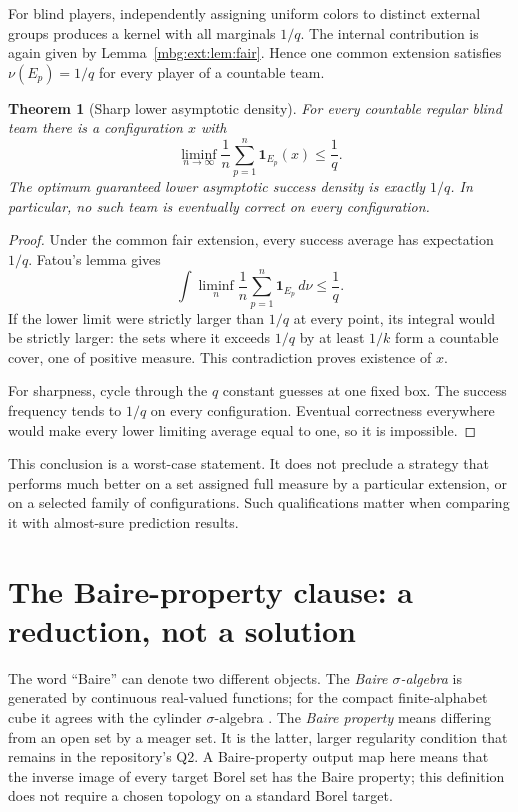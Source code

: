 \documentclass[11pt,letterpaper]{article}
\newtheorem{theorem}{Theorem}[section]
\theoremstyle{definition}
\newcommand{\ind}{\mathbf 1}
\begin{document}
For blind players, independently assigning uniform colors to distinct external groups produces a kernel with all marginals $1/q$. The internal contribution is again given by Lemma~\ref{mbg:ext:lem:fair}. Hence one common extension satisfies $\nu(E_p)=1/q$ for every player of a countable team.

\begin{theorem}[Sharp lower asymptotic density]
\label{mbg:ext:thm:asymptotic}
For every countable regular blind team there is a configuration $x$ with
\[
\liminf_{n\to\infty}\frac1n\sum_{p=1}^n\ind_{E_p}(x)\le\frac1q.
\]
The optimum guaranteed lower asymptotic success density is exactly $1/q$. In particular, no such team is eventually correct on every configuration.
\end{theorem}
\begin{proof}
Under the common fair extension, every success average has expectation $1/q$. Fatou's lemma gives
\[
\int\liminf_n\frac1n\sum_{p=1}^n\ind_{E_p}\,d\nu\le\frac1q.
\]
If the lower limit were strictly larger than $1/q$ at every point, its integral would be strictly larger: the sets where it exceeds $1/q$ by at least $1/k$ form a countable cover, one of positive measure. This contradiction proves existence of $x$.

For sharpness, cycle through the $q$ constant guesses at one fixed box. The success frequency tends to $1/q$ on every configuration. Eventual correctness everywhere would make every lower limiting average equal to one, so it is impossible.
\end{proof}

This conclusion is a worst-case statement. It does not preclude a strategy that performs much better on a set assigned full measure by a particular extension, or on a selected family of configurations. Such qualifications matter when comparing it with almost-sure prediction results.

\section{The Baire-property clause: a reduction, not a solution}
\label{mbg:ext:sec:category}

The word ``Baire'' can denote two different objects. The \emph{Baire $\sigma$-algebra} is generated by continuous real-valued functions; for the compact finite-alphabet cube it agrees with the cylinder $\sigma$-algebra \cite[4A3N]{ext:Fremlin4A}. The \emph{Baire property} means differing from an open set by a meager set. It is the latter, larger regularity condition that remains in the repository's Q2. A Baire-property output map here means that the inverse image of every target Borel set has the Baire property; this definition does not require a chosen topology on a standard Borel target.
\end{document}
